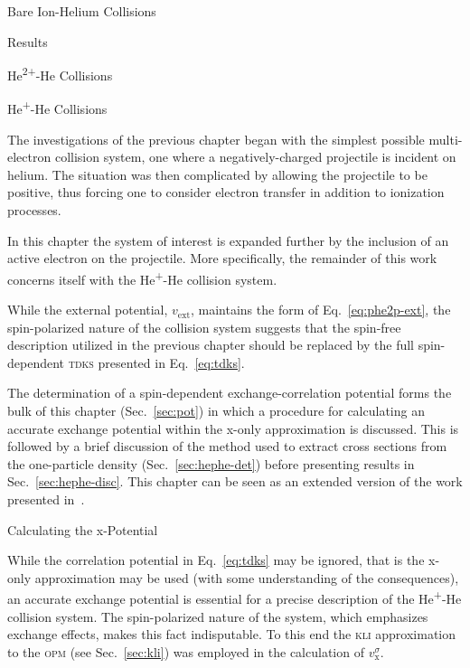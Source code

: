 \documentclass[a5paper, 9 pt]{extreport}
\begin{document}
\begin{chapter}{Bare Ion-Helium Collisions \label{chap:p-he2p-he}}
\begin{section}{Results \label{sec:phe2p-res}}
\begin{subsection}{\texorpdfstring{He\textsuperscript{2+}}{He2+}-He Collisions
                         \label{sec:he2phe-res}}
      \end{subsection}

   \end{section}

\end{chapter}

\begin{chapter}{\texorpdfstring{He\textsuperscript{+}}{He+}-He Collisions \label{chap:hephe}}

   The investigations of the previous chapter began with the simplest possible multi-electron collision
   system, one where a negatively-charged projectile is incident on helium. The situation was then
   complicated by allowing the projectile to be positive, thus forcing one to consider electron transfer
   in addition to ionization processes.

   In this chapter the system of interest is expanded further by the inclusion of an active electron on
   the projectile. More specifically, the remainder of this work concerns itself with the
   He\textsuperscript{+}-He collision system.

   While the external potential, $v_\mathrm{ext}$, maintains the form of Eq.~\eqref{eq:phe2p-ext}, the
   spin-polarized nature of the collision system suggests that the spin-free description utilized in the
   previous chapter should be replaced by the full spin-dependent \textsc{tdks} presented in
   Eq.~\eqref{eq:tdks}.

   The determination of a spin-dependent exchange-correlation potential forms the bulk of this chapter
   (Sec.~\ref{sec:pot}) in which a procedure for calculating an accurate exchange potential within the
   x-only approximation is discussed. This is followed by a brief discussion of the method used to
   extract cross sections from the one-particle density (Sec.~\ref{sec:hephe-det}) before presenting
   results in Sec.~\ref{sec:hephe-disc}. This chapter can be seen as an extended version of the work
   presented in~\cite{hephe}.

   \begin{section}{Calculating the x-Potential \label{sec:pot}}

      While the correlation potential in Eq.~\eqref{eq:tdks} may be ignored, that is the x-only
      approximation may be used (with some understanding of the consequences), an accurate exchange
      potential is essential for a precise description of the He\textsuperscript{+}-He collision
      system. The spin-polarized nature of the system, which emphasizes exchange effects, makes this
      fact indisputable. To this end the \textsc{kli} approximation to the \textsc{opm}
      (see Sec.~\ref{sec:kli}) was employed in the calculation of $v^\sigma_\mathrm{x}$.


\end{section}
\end{chapter}
\end{document}
